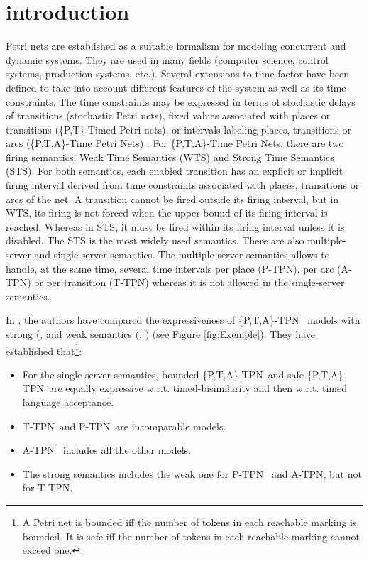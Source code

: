 \documentclass[submission,copyright,creativecommons]{eptcs}
\numberwithin{equation}{section}
\def\tapn{A-TPN}
\def\tppn{P-TPN}
\def\ttpn{T-TPN}
\def\ttappn{\{P,T,A\}-TPN}
\begin{document}
\section{introduction}
Petri nets are established as a suitable formalism for modeling
 concurrent and dynamic systems. They are used in many fields (computer science, control systems, production systems, etc.). Several extensions to time factor have
been defined to take into account different features of the system as well as its time constraints. The time constraints may be expressed in terms of stochastic delays of transitions (stochastic Petri nets), fixed values associated with places or transitions (\{P,T\}-Timed Petri nets), or intervals labeling places, transitions or arcs (\{P,T,A\}-Time Petri Nets) \cite{khansa-wodes-96,Merlin,Walter}. For \{P,T,A\}-Time Petri Nets, there are two firing semantics: Weak Time Semantics (WTS) and Strong Time Semantics (STS). For both semantics, each enabled transition has an explicit or implicit firing interval derived from time constraints associated with places, transitions or arcs of the net. A transition cannot be fired outside its firing interval, but in WTS, its firing is not forced when the upper bound of its firing interval is reached. Whereas in STS, it must be fired within its firing interval unless it is disabled. The STS is the most widely used semantics. There are also multiple-server and single-server semantics. The multiple-server semantics allows to handle, at the same time, several time intervals per place (P-TPN), per arc (A-TPN) or per transition (T-TPN) whereas it is not allowed in the single-server semantics. \par In \cite{boyer-FI-08}, the authors have compared the expressiveness of \ttappn~
models with strong (,  and weak semantics ({}, ) (see Figure \ref{fig:Exemple}). They have established that\footnote{A Petri net is bounded iff the number of tokens in each reachable marking is bounded. It is safe iff the number of tokens in each reachable marking cannot exceed one.}:\begin{itemize}
\item For the single-server semantics, bounded \ttappn~and safe \ttappn~are equally expressive w.r.t. timed-bisimilarity and then w.r.t. timed language acceptance.
\item \ttpn~and \tppn~are incomparable models.
\item \tapn~ includes all the other models.
 \item The strong semantics includes the weak one for \tppn~  and
  \tapn, but not for \ttpn.
\end{itemize}
\end{document}
